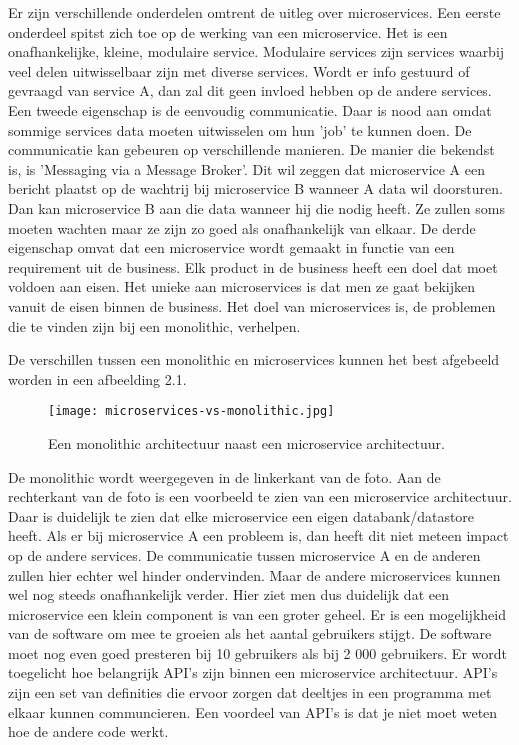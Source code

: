 Er zijn verschillende onderdelen omtrent de uitleg over microservices. Een eerste onderdeel spitst zich toe op de  werking van een microservice. Het is een onafhankelijke, kleine, modulaire service. Modulaire services zijn services waarbij veel delen uitwisselbaar zijn met diverse services. Wordt er info gestuurd of gevraagd van service A, dan zal dit geen invloed hebben op de andere services. Een tweede eigenschap is de eenvoudig communicatie. Daar is nood aan omdat sommige services data moeten uitwisselen om hun 'job' te kunnen doen. De communicatie kan gebeuren op verschillende manieren. De manier die bekendst is, is 'Messaging via a Message Broker'. Dit wil zeggen dat microservice A een bericht plaatst op de wachtrij bij microservice B wanneer A data wil doorsturen. Dan kan microservice B aan die data wanneer hij die nodig heeft. Ze zullen soms moeten wachten maar ze zijn zo goed als onafhankelijk van elkaar. De derde eigenschap omvat dat een microservice wordt gemaakt in functie van een requirement uit de business. Elk product in de business heeft een doel dat moet voldoen aan eisen. Het unieke aan microservices is dat  men  ze gaat bekijken vanuit de eisen binnen de business. Het doel van microservices is, de problemen die te vinden zijn bij een monolithic, verhelpen. 
 
De verschillen tussen een monolithic en microservices kunnen het best afgebeeld worden in een afbeelding 2.1.

\begin{figure}[h!]
	\texttt{[image: microservices-vs-monolithic.jpg]}
	\centering
	\caption{Een monolithic architectuur naast een microservice architectuur. \textcite{Watts2018}}
\end{figure}
 De monolithic wordt  weergegeven in de linkerkant van de foto. Aan de rechterkant van de foto is een voorbeeld te zien van een microservice architectuur. Daar is duidelijk te zien dat elke microservice een eigen databank/datastore heeft. 
 Als er bij microservice A een probleem is, dan heeft dit niet meteen impact op de andere services. De communicatie tussen microservice A en de anderen zullen hier echter wel hinder ondervinden. Maar de andere microservices kunnen wel nog steeds onafhankelijk verder. 
 Hier ziet men dus duidelijk dat een microservice een klein component is van een groter geheel.
 Er is een mogelijkheid van de software om mee te groeien als het aantal gebruikers stijgt. De software moet nog even goed presteren bij 10 gebruikers als bij 2 000 gebruikers. Er wordt toegelicht hoe belangrijk API's zijn binnen een microservice architectuur. API's zijn een set van definities die ervoor zorgen dat deeltjes in een programma met elkaar kunnen communcieren. Een voordeel van API's is dat je niet moet  weten hoe de andere code werkt.

